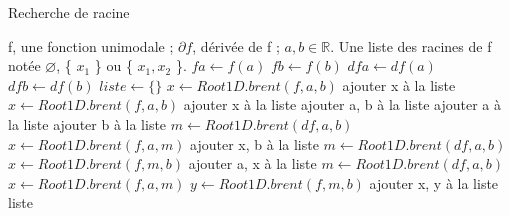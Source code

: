 \documentclass[a4paper, 12pt]{article}
\begin{document}
\begin{algorithm}

\caption{Recherche de racine}
\label{Modele pour un algo}

\begin{algorithmic}

\REQUIRE f, une fonction unimodale ; \( \partial f \), dérivée de f ; \( a, b  \in \mathbb{R} \).
\ENSURE Une liste des racines de f notée \( \varnothing \), \{ \( x_1 \) \} ou \{ \( x_1, x_2 \) \}.
\STATE \( fa \leftarrow f(a) \)
\STATE \( fb \leftarrow f(b) \)
\STATE \( dfa \leftarrow df(a) \)
\STATE \( dfb \leftarrow df(b) \)
\STATE \( liste \leftarrow \{\} \)
	\STATE \( x \leftarrow Root1D.brent(f, a, b) \)
	\STATE ajouter x à la liste
	\STATE \( x \leftarrow Root1D.brent(f, a, b) \)
	\STATE ajouter x à la liste
	\STATE ajouter a, b à la liste
	\STATE ajouter a à la liste
	\STATE ajouter b à la liste
	\STATE \( m \leftarrow Root1D.brent(df, a, b) \)
	\STATE \( x \leftarrow Root1D.brent(f, a, m) \)
	\STATE ajouter x, b à la liste
	\STATE \( m \leftarrow Root1D.brent(df, a, b) \)
	\STATE \( x \leftarrow Root1D.brent(f, m, b) \)
	\STATE ajouter a, x à la liste
	\STATE \( m \leftarrow Root1D.brent(df, a, b) \)
	\STATE \( x \leftarrow Root1D.brent(f, a, m) \)
	\STATE \( y \leftarrow Root1D.brent(f, m, b) \)
	\STATE ajouter x, y à la liste
\ENDIF
\RETURN liste

\end{algorithmic}

\end{algorithm}
\end{document}

